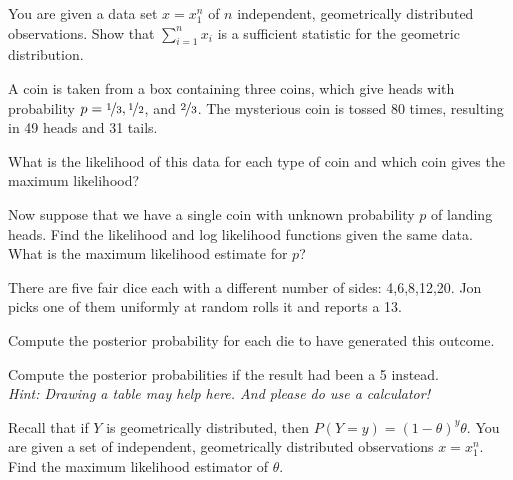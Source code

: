 \documentclass[10pt, a5paper]{scrartcl}
\begin{document}
\boardquestions


\begin{exercise}
	You are given a data set $ x=x_{1}^{n} $ of $ n $ independent, geometrically distributed observations.
Show that $ \sum_{i=1}^{n} x_i $ is a sufficient statistic for the geometric distribution.
\end{exercise}


\begin{exercise}[Covariance]
	A coin is taken from a box containing three coins, which give heads with probability $p = \nicefrac{1}{3}, \nicefrac{1}{2}$, and $\nicefrac{2}{3}$. The mysterious coin is tossed 80 times, resulting in 49 heads and 31 tails.

	\begin{subex}
		What is the likelihood of this data for each type of coin and which coin gives the maximum likelihood?
	\end{subex}

	\begin{subex}
		Now suppose that we have a single coin with unknown probability $p$ of landing heads. Find the likelihood and log likelihood functions given the same data. What is the maximum likelihood estimate for $p$?
	\end{subex}
\end{exercise}


\begin{exercise}[Dice]
There are five fair dice each with a different number of sides: 4,6,8,12,20.
Jon picks one of them uniformly at random rolls it and reports a 13.

	\begin{subex}	
		Compute the posterior probability for each die to have generated this outcome.
	\end{subex}
	
	\begin{subex}	
		Compute the posterior probabilities if the result had been a 5 instead. \\
		\emph{Hint: Drawing a table may help here. And please do use a calculator!}
	\end{subex}
\end{exercise}



\begin{exercise}
	Recall that if $Y$ is  geometrically distributed, then $P(Y=y) = (1-\theta)^{y}\theta$.
	You are given a set of independent, geometrically distributed observations $x = x_{1}^{n}$.
	Find the maximum likelihood estimator of $\theta$.
\end{exercise}


\vfill
{}
\end{document}
